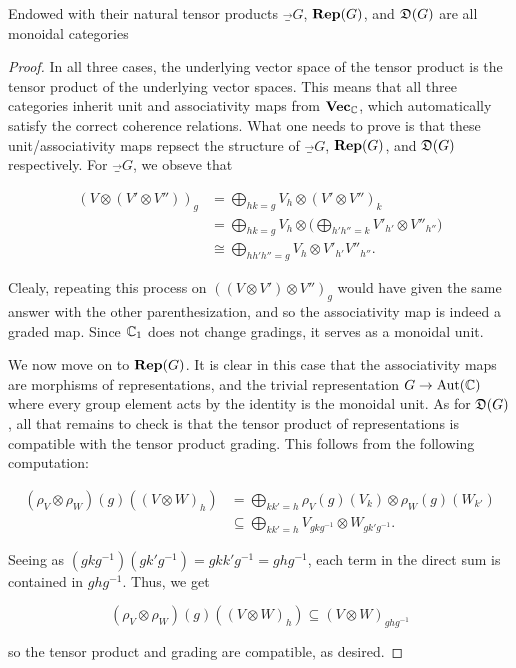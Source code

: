 \begin{prop} Endowed with their natural tensor products $\Vec_G$, ${\bf Rep}(G)$, and ${\mathfrak D}(G)$ are all monoidal categories
\end{prop}
\begin{proof}In all three cases, the underlying vector space of the tensor product is the tensor product of the underlying vector spaces. This means that all three categories inherit unit and associativity maps from ${\bf Vec}_{{\mathbb C}}$, which automatically satisfy the correct coherence relations. What one needs to prove is that these unit/associativity maps repsect the structure of $\Vec_G$, ${\bf Rep}(G)$, and ${\mathfrak D}(G)$ respectively. For $\Vec_G$, we obseve that

\begin{align*}
(V\otimes (V'\otimes V''))_g &=\bigoplus_{hk=g}V_h\otimes (V'\otimes V'')_k\\
&=\bigoplus_{hk=g}V_h\otimes \big(\bigoplus_{h'h''=k}V'_{h'}\otimes V''_{h''}\big)\\
&\cong \bigoplus_{hh'h''=g}V_h\otimes V'_{h'}V''_{h''}.
\end{align*}

Clealy, repeating this process on $((V\otimes V')\otimes V'')_g$ would have given the same answer with the other parenthesization, and so the associativity map is indeed a graded map. Since ${\mathbb C}_{1}$ does not change gradings, it serves as a monoidal unit.

We now move on to ${\bf Rep}(G)$. It is clear in this case that the associativity maps are morphisms of representations, and the trivial representation $G\to \operatorname{Aut}({\mathbb C})$ where every group element acts by the identity is the monoidal unit. As for ${\mathfrak D}(G)$, all that remains to check is that the tensor product of representations is compatible with the tensor product grading. This follows from the following computation:

\begin{align*}
(\rho_V\otimes \rho_W)(g)((V\otimes W)_h)&=\bigoplus_{kk'=h}\rho_V(g)(V_k)\otimes \rho_W(g)(W_{k'})\\
&\subseteq \bigoplus_{kk'=h}V_{g k g^{-1}}\otimes W_{gk'g^{-1}}.
\end{align*}

Seeing as $(gkg^{-1})(gk'g^{-1})=gkk'g^{-1}=ghg^{-1}$, each term in the direct sum is contained in $ghg^{-1}$. Thus, we get

$$(\rho_V\otimes \rho_W)(g)((V\otimes W)_h)\subseteq (V\otimes W)_{ghg^{-1}}$$

so the tensor product and grading are compatible, as desired.
\end{proof}

